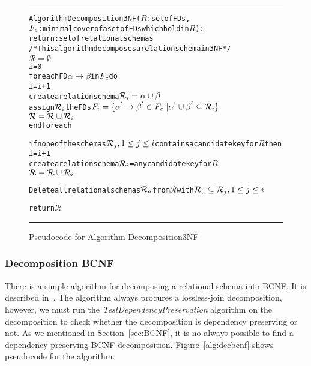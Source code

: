 \begin{figure}[htbp]
\hrule
\vspace{0.25cm}
\begin{alltt}
Algorithm Decomposition3NF(\(R\): set of FDs,
             \(F\sb{c}\): minimal cover of a set of FDs which hold in \(R\)):
          return: set of relational schemas  
/* This algorithm decomposes a relation schema in 3NF */
  \(\mathcal{R} = \emptyset\)
  i = 0
  foreach FD \(\alpha \rightarrow \beta\) in \(F\sb{c}\) do
    i = i + 1
    create a relation schema \(\mathcal{R}\sb{i} = \alpha \cup \beta\)
    assign \(\mathcal{R}\sb{i}\) the FDs  \(F\sb{i} = \{\alpha\sp{'} \rightarrow \beta\sp{'} \in F\sb{c}\ | \alpha\sp{'} \cup \beta\sp{'} \subseteq \mathcal{R}\sb{i}\}\)
    \(\mathcal{R} = \mathcal{R} \cup \mathcal{R}\sb{i}\)
  end foreach
  
  if none of the schemas \(\mathcal{R}\sb{j}, 1\leq{}j\leq{}i\) contains a candidate key for \(R\) then
    i = i + 1
    create a relation schema \(\mathcal{R}\sb{i}\) = any candidate key for \(R\)
    \(\mathcal{R} = \mathcal{R} \cup \mathcal{R}\sb{i}\)
    
  Delete all relational schemas \(\mathcal{R}\sb{a}\) from \(\mathcal{R}\) with \(\mathcal{R}\sb{a} \subseteq \mathcal{R}\sb{j},  1 \leq j \leq i\)
  
  return \(\mathcal{R}\)
\end{alltt}
\caption{Pseudocode for Algorithm Decomposition3NF}\label{alg:dec3nf}
\hrule
\end{figure}

\subsubsection{Decomposition BCNF}
There is a simple algorithm for decomposing a relational schema into BCNF.
It is described in~\cite[Section 6.9]{bdb2}. The algorithm always 
procures a lossless-join decomposition, however, we must run the 
\textit{TestDependencyPreservation} algorithm on
the decomposition to check whether the decomposition is dependency preserving or not. 
As we mentioned in Section~\ref{sec:BCNF},
it is no always possible to find a dependency-preserving BCNF decomposition.
Figure~\ref{alg:decbcnf} shows pseudocode for the algorithm.


